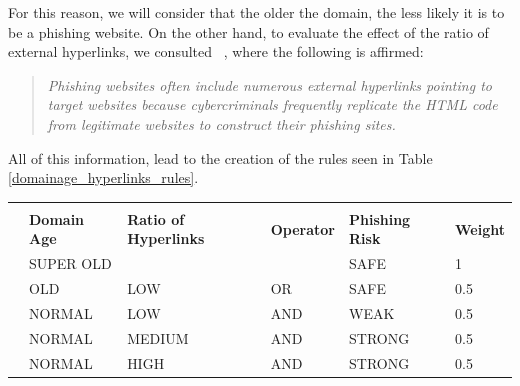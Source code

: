 \documentclass[11pt]{article}
\begin{document}
For this reason, we will consider that the older the domain, the less likely it is to be a phishing website. On the other hand, to evaluate the effect of the ratio of external hyperlinks, we consulted ~\cite{externalhyperlinks}, where the following is affirmed:

\begin{quote}
\textit{Phishing websites often include numerous external hyperlinks pointing to target websites because cybercriminals frequently replicate the HTML code from legitimate websites to construct their phishing sites.}
\end{quote}

All of this information, lead to the creation of the rules seen in Table \ref{domainage_hyperlinks_rules}.

\begin{table}[H]
    \centering
    \begin{tabular}{llllll}
                          &                                     &                                          &                               &                                    &                             \\ \cline{2-6} 
    \multicolumn{1}{l|}{} & \multicolumn{1}{l|}{\textbf{Domain Age}}     & \multicolumn{1}{l|}{\textbf{Ratio of Hyperlinks}} & \multicolumn{1}{l|}{\textbf{Operator}} & \multicolumn{1}{l|}{\textbf{Phishing Risk}} & \multicolumn{1}{l|}{\textbf{Weight}} \\ \cline{2-6} 
    \multicolumn{1}{l|}{} & \multicolumn{1}{l|}{SUPER OLD}      & \multicolumn{1}{l|}{}                    & \multicolumn{1}{l|}{}         & \multicolumn{1}{l|}{SAFE}          & \multicolumn{1}{l|}{1}      \\ \cline{2-6} 
    \multicolumn{1}{l|}{} & \multicolumn{1}{l|}{OLD}            & \multicolumn{1}{l|}{LOW}                 & \multicolumn{1}{l|}{OR}       & \multicolumn{1}{l|}{SAFE}          & \multicolumn{1}{l|}{0.5}    \\ \cline{2-6} 
    \multicolumn{1}{l|}{} & \multicolumn{1}{l|}{NORMAL}         & \multicolumn{1}{l|}{LOW}                 & \multicolumn{1}{l|}{AND}      & \multicolumn{1}{l|}{WEAK}          & \multicolumn{1}{l|}{0.5}    \\ \cline{2-6} 
    \multicolumn{1}{l|}{} & \multicolumn{1}{l|}{NORMAL}         & \multicolumn{1}{l|}{MEDIUM}              & \multicolumn{1}{l|}{AND}      & \multicolumn{1}{l|}{STRONG}        & \multicolumn{1}{l|}{0.5}    \\ \cline{2-6} 
    \multicolumn{1}{l|}{} & \multicolumn{1}{l|}{NORMAL}         & \multicolumn{1}{l|}{HIGH}                & \multicolumn{1}{l|}{AND}      & \multicolumn{1}{l|}{STRONG}        & \multicolumn{1}{l|}{0.5}    \\ \cline{2-6} 

\end{tabular}
\end{table}
\end{document}
